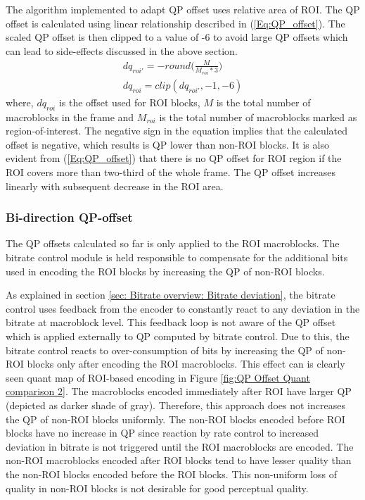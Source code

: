 \documentclass[11pt]{article} %
\begin{document}
The algorithm implemented to adapt QP offset uses relative area of ROI. The QP offset is calculated using linear relationship described in (\ref{Eq:QP_offset}). The scaled QP offset is then clipped to a value of -6 to avoid large QP offsets which can lead to side-effects discussed in the above section.
\begin{equation}
	\label{Eq:QP_offset}
	\begin{aligned}
	dq_{roi'} = -round\Big(\frac{M}{M_{roi} * 3}\Big) \\
	dq_{roi} = clip(dq_{roi'}, -1 , -6)
	\end{aligned}	
\end{equation}
where, $dq_{roi}$ is the offset used for ROI blocks, $M$ is the total number of macroblocks in the frame and $M_{roi}$ is the total number of macroblocks marked as region-of-interest. The negative sign in the equation implies that the calculated offset is negative, which results is QP lower than non-ROI blocks. It is also evident from (\ref{Eq:QP_offset}) that there is no QP offset for ROI region if the ROI covers more than two-third of the whole frame. The QP offset increases linearly with subsequent decrease in the ROI area.

\subsubsection{Bi-direction QP-offset}
The QP offsets calculated so far is only applied to the ROI macroblocks. The bitrate control module is held responsible to compensate for the additional bits used in encoding the ROI blocks by increasing the QP of non-ROI blocks. 

As explained in section \ref{sec: Bitrate overview: Bitrate deviation}, the bitrate control uses feedback from the encoder to constantly react to any deviation in the bitrate at macroblock level. This feedback loop is not aware of the QP offset which is applied externally to QP computed by bitrate control. Due to this, the bitrate control reacts to over-consumption of bits by increasing the QP of non-ROI blocks only after encoding the ROI macroblocks. This effect can is clearly seen quant map of ROI-based encoding in Figure \ref{fig:QP Offset Quant comparison 2}. The macroblocks encoded immediately after ROI have larger QP (depicted as darker shade of gray). Therefore, this approach does not increases the QP of non-ROI blocks uniformly. The non-ROI blocks encoded before ROI blocks have no increase in QP since reaction by rate control to increased deviation in bitrate is not triggered until the ROI macroblocks are encoded. The non-ROI macroblocks encoded after ROI blocks tend to have lesser quality than the non-ROI blocks encoded before the ROI blocks. This non-uniform loss of quality in non-ROI blocks is not desirable for good perceptual quality. 
\end{document}
